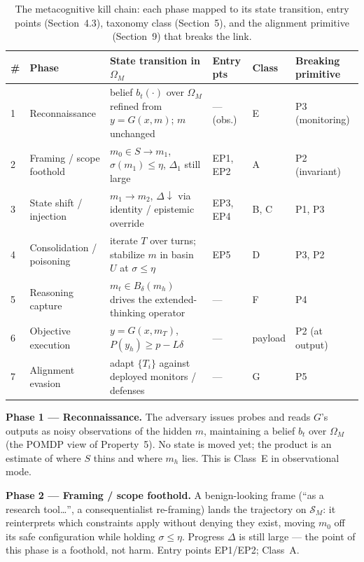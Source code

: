 \documentclass[
  11pt,
]{article}
\begin{document}
\begin{table}[h]
\centering
\footnotesize
\setlength{\tabcolsep}{4pt}
\renewcommand{\arraystretch}{1.25}
\begin{tabular}{@{}p{0.35cm}p{2.2cm}p{4.9cm}p{1.5cm}p{1.1cm}p{2.1cm}@{}}
\toprule
\# & Phase & State transition in \(\Omega_M\) & Entry pts & Class & Breaking primitive \\
\midrule
1 & Reconnaissance & belief \(b_t(\cdot)\) over \(\Omega_M\) refined from \(y=G(x,m)\); \(m\) unchanged & --- (obs.) & E & P3 (monitoring) \\
2 & Framing / scope foothold & \(m_0\!\in\!S \to m_1\), \(\sigma(m_1)\!\le\!\eta\), \(\Delta_1\) still large & EP1, EP2 & A & P2 (invariant) \\
3 & State shift / injection & \(m_1 \to m_2\), \(\Delta\!\downarrow\) via identity / epistemic override & EP3, EP4 & B, C & P1, P3 \\
4 & Consolidation / poisoning & iterate \(T\) over turns; stabilize \(m\) in basin \(U\) at \(\sigma\!\le\!\eta\) & EP5 & D & P3, P2 \\
5 & Reasoning capture & \(m_t\!\in\!B_\delta(m_h)\) drives the extended-thinking operator & --- & F & P4 \\
6 & Objective execution & \(y=G(x,m_T)\), \(P(y_h)\!\ge\!p-L\delta\) & --- & payload & P2 (at output) \\
7 & Alignment evasion & adapt \(\{T_i\}\) against deployed monitors / defenses & --- & G & P5 \\
\bottomrule
\end{tabular}
\caption{The metacognitive kill chain: each phase mapped to its state
transition, entry points (Section~4.3), taxonomy class (Section~5), and
the alignment primitive (Section~9) that breaks the link.}\label{tab:mkc}
\end{table}

\textbf{Phase 1 --- Reconnaissance.} The adversary issues probes and
reads \(G\)'s outputs as noisy observations of the hidden \(m\),
maintaining a belief \(b_t\) over \(\Omega_M\) (the POMDP view of
Property~5). No state is moved yet; the product is an estimate of where
\(S\) thins and where \(m_h\) lies. This is Class~E in observational
mode.

\textbf{Phase 2 --- Framing / scope foothold.} A benign-looking frame
(``as a research tool\ldots'', a consequentialist re-framing) lands the
trajectory on \(\mathcal{S}_M\): it reinterprets which constraints apply
without denying they exist, moving \(m_0\) off its safe configuration
while holding \(\sigma \le \eta\). Progress \(\Delta\) is still large ---
the point of this phase is a foothold, not harm. Entry points EP1/EP2;
Class~A.
\end{document}
